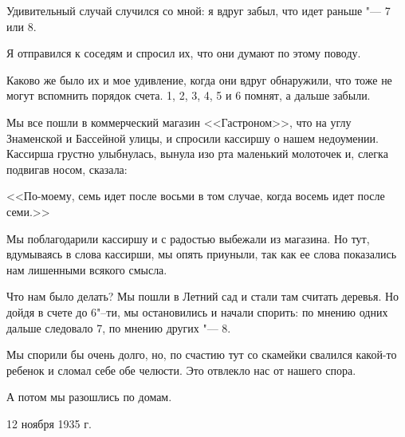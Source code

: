 Удивительный случай случился со мной: я вдруг забыл, что идет раньше "--- 7 или 8.

Я отправился к соседям и спросил их, что они думают по этому поводу.

Каково же было их и мое удивление, когда они вдруг обнаружили, что тоже не могут вспомнить порядок счета. 1, 2, 3, 4, 5 и 6 помнят, а дальше забыли.

Мы все пошли в коммерческий магазин <<Гастроном>>, что на углу Знаменской и Бассейной улицы, и спросили кассиршу о нашем недоумении. Кассирша грустно улыбнулась, вынула изо рта маленький молоточек и, слегка подвигав носом, сказала:

<<По-моему, семь идет после восьми в том случае, когда восемь идет после семи.>>

Мы поблагодарили кассиршу и с радостью выбежали из магазина. Но тут, вдумываясь в слова кассирши, мы опять приуныли, так как ее слова показались нам лишенными всякого смысла.

Что нам было делать? Мы пошли в Летний сад и стали там считать деревья. Но дойдя в счете до 6"--ти, мы остановились и начали спорить: по мнению одних дальше следовало 7, по мнению других "--- 8.

Мы спорили бы очень долго, но, по счастию тут со скамейки свалился какой-то ребенок и сломал себе обе челюсти. Это отвлекло нас от нашего спора.

А потом мы разошлись по домам.

12 ноября 1935 г.